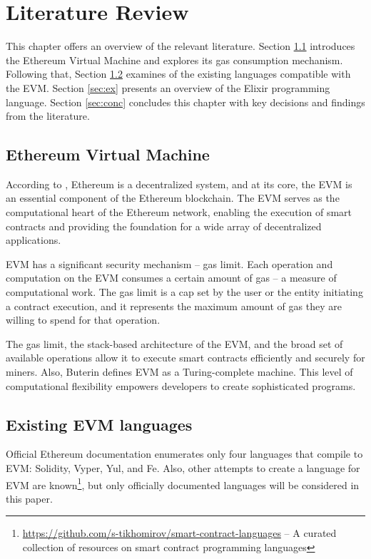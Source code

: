 \chapter{Literature Review}
\label{chap:lr}

This chapter offers an overview of the relevant literature. Section \ref{sec:evm} introduces the Ethereum Virtual Machine and explores its gas consumption mechanism. Following that, Section \ref{sec:langs} examines of the existing languages compatible with the EVM. Section \ref{sec:ex} presents an overview of the Elixir programming language. Section \ref{sec:conc} concludes this chapter with key decisions and findings from the literature.

\section{Ethereum Virtual Machine}
\label{sec:evm}
According to \cite{EthereumWhitepaper}, Ethereum is a decentralized system, and at its core, the EVM is an essential component of the Ethereum blockchain. The EVM serves as the computational heart of the Ethereum network, enabling the execution of smart contracts and providing the foundation for a wide array of decentralized applications.

EVM has a significant security mechanism -- gas limit. Each operation and computation on the EVM consumes a certain amount of gas -- a measure of computational work. The gas limit is a cap set by the user or the entity initiating a contract execution, and it represents the maximum amount of gas they are willing to spend for that operation.

The gas limit, the stack-based architecture of the EVM, and the broad set of available operations allow it to  execute smart contracts efficiently and securely for miners. Also, Buterin \cite{EthereumWhitepaper} defines EVM as a Turing-complete machine. This level of computational flexibility empowers developers to create sophisticated programs.

\section{Existing EVM languages}
\label{sec:langs}
Official Ethereum documentation \cite{OfficialEthereumLanguages} enumerates only four languages that compile to EVM: Solidity, Vyper, Yul, and Fe. Also, other attempts to create a language for EVM are known\footnote{\href{https://github.com/s-tikhomirov/smart-contract-languages}{https://github.com/s-tikhomirov/smart-contract-languages} -- A curated collection of resources on smart contract programming languages}, but only officially documented languages will be considered in this paper.

